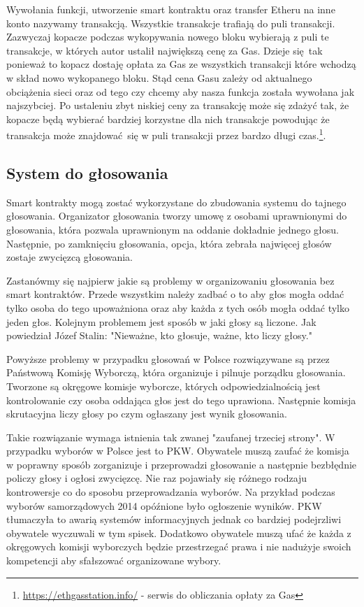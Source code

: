 \documentclass[]{llncs}
\begin{document}
  Wywołania funkcji, utworzenie smart kontraktu oraz transfer Etheru na inne
  konto nazywamy transakcją. Wszystkie transakcje trafiają do puli transakcji.
  Zazwyczaj kopacze podczas wykopywania nowego bloku wybierają z puli te
  transakcje, w których autor ustalił największą cenę za Gas. Dzieje się tak
  ponieważ to kopacz dostaję opłata za Gas ze wszystkich transakcji które
  wchodzą w skład nowo wykopanego bloku. Stąd cena Gasu zależy od aktualnego
  obciążenia sieci oraz od tego czy chcemy aby nasza funkcja została wywołana
  jak najszybciej. Po ustaleniu zbyt niskiej ceny za transakcję może się zdażyć
  tak, że kopacze będą wybierać bardziej korzystne dla nich transakcje powodując
  że transakcja może znajdować się w puli transakcji przez bardzo długi
  czas.\footnote{\url{https://ethgasstation.info/} - serwis do obliczania opłaty
  za Gas}.

\subsection{System do głosowania}

  Smart kontrakty mogą zostać wykorzystane do zbudowania systemu do tajnego
  głosowania. Organizator głosowania tworzy umowę z osobami uprawnionymi do
  głosowania, która pozwala uprawnionym na oddanie dokładnie jednego głosu.
  Następnie, po zamknięciu głosowania, opcja, która zebrała najwięcej głosów
  zostaje zwycięzcą głosowania.

  Zastanówmy się najpierw jakie są problemy w organizowaniu głosowania bez smart
  kontraktów. Przede wszystkim należy zadbać o to aby głos mogła oddać tylko
  osoba do tego upoważniona oraz aby każda z tych osób mogła oddać tylko jeden
  głos. Kolejnym problemem jest sposób w jaki głosy są liczone. Jak powiedział
  Józef Stalin: "Nieważne, kto głosuje, ważne, kto liczy głosy."

  Powyższe problemy w przypadku głosowań w Polsce rozwiązywane są przez
  Państwową Komisję Wyborczą, która organizuje i pilnuje porządku głosowania.
  Tworzone są okręgowe komisje wyborcze, których odpowiedzialnością jest
  kontrolowanie czy osoba oddająca głos jest do tego uprawiona. Następnie
  komisja skrutacyjna liczy głosy po czym ogłaszany jest wynik głosowania.

  Takie rozwiązanie wymaga istnienia tak zwanej "zaufanej trzeciej strony". W
  przypadku wyborów w Polsce jest to PKW. Obywatele muszą zaufać że komisja w
  poprawny sposób zorganizuje i przeprowadzi głosowanie a następnie bezbłędnie
  policzy głosy i ogłosi zwycięzcę.  Nie raz pojawiały się różnego rodzaju
  kontrowersje co do sposobu przeprowadzania wyborów. Na przykład podczas
  wyborów samorządowych 2014 opóźnione było ogłoszenie wyników.  PKW tłumaczyła
  to awarią systemów informacyjnych jednak co bardziej podejrzliwi obywatele
  wyczuwali w tym spisek. Dodatkowo obywatele muszą ufać że każda z okręgowych
  komisji wyborczych będzie przestrzegać prawa i nie nadużyje swoich kompetencji
  aby sfałszować organizowane wybory.
\end{document}
